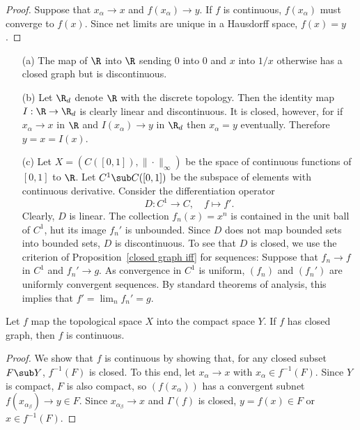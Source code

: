 \begin{proof}
Suppose that $x_\alpha\to x$ and $f(x_\alpha)\to y$. If $f$ is continuous, $f(x_\alpha)$ must converge to $f(x)$. Since net limits are unique in a Hausdorff space, $f(x)=y$.
\end{proof}
\begin{example}\label{closed linear map non continuous}
\mbox{}
\begin{itemize}
\item[(a)] The map of $\R$ into $\R$ sending $0$ into $0$ and $x$ into $1/x$ otherwise has a closed graph but is discontinuous.
\item[(b)] Let $\R_d$ denote $\R$ with the discrete topology. Then the identity map $I:\R\to\R_d$ is clearly linear and discontinuous. It is closed, however, for if $x_\alpha\to x$ in $\R$ and $I(x_\alpha)\to y$ in $\R_d$ then $x_\alpha=y$ eventually. Therefore $y=x=I(x)$.
\item[(c)] Let $X=(C([0,1]),\|\cdot\|_\infty)$ be the space of continuous functions of $[0,1]$ to $\R$. Let $C^1\sub C([0,1])$ be the subspace of elements with continuous derivative. Consider the differentiation operator 
\[D:C^1\to C,\quad f\mapsto f'.\]
Clearly, $D$ is linear. The collection $f_n(x)=x^n$ is contained in the unit ball of $C^1$, hut its image $f_n'$ is unbounded. Since $D$ does not map bounded sets into bounded sets, $D$ is discontinuous. To see that $D$ is closed, we use the criterion of Proposition~\ref{closed graph iff} for sequences: Suppose that $f_n\to f$ in $C^1$ and $f_n'\to g$. As convergence in $C^1$ is uniform, $(f_n)$ and $(f_n')$ are uniformly
convergent sequences. By standard theorems of analysis, this implies that $f'=\lim_nf_n'=g$.
\end{itemize}
\end{example}
\begin{proposition}\label{closed graph compact domain is continuous}
Let $f$ map the topological space $X$ into the compact space $Y$. If $f$ has closed graph, then $f$ is continuous.
\end{proposition}
\begin{proof}
We show that $f$ is continuous by showing that, for any closed subset $F\sub Y$, $f^{-1}(F)$ is closed. To this end, let $x_\alpha\to x$ with $x_\alpha\in f^{-1}(F)$. Since $Y$ is compact, $F$ is also compact, so $(f(x_\alpha))$ has a convergent subnet $f(x_{\alpha_\beta})\to y\in F$. Since $x_{\alpha_\beta}\to x$ and $\Gamma(f)$ is closed, $y=f(x)\in F$ or $x\in f^{-1}(F)$.
\end{proof}
